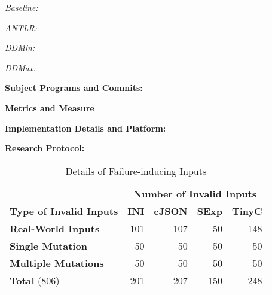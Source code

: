 \documentclass[sigconf,review,anonymous]{acmart}
\newcounter{todocounter}
\newcommand{\todo}[1]{\marginpar{$|$}\textcolor{red}{\stepcounter{todocounter}\footnote[\thetodocounter]{\textcolor{red}{\textbf{TODO }}\textit{#1}}}}
\renewcommand{\todo}[1]{}
\begin{document}
\todo{cite and create command shortcuts for the state-of-the-art}

\noindent \textit{Baseline:}

\noindent \textit{ANTLR:}

\noindent \textit{DDMin:}

\noindent \textit{DDMax:}




\noindent
\textbf{Subject Programs and Commits:}


\noindent
\textbf{Metrics and Measure}

\noindent
\textbf{Implementation Details and Platform:}

\noindent
\textbf{Research Protocol:} 



\begin{table}[!tbp]\centering
\caption{Details of Failure-inducing Inputs}
\begin{tabular}{|l | r | r | r | r |}
\hline
&  \multicolumn{4}{c|}{\textbf{Number of Invalid Inputs}}  \\
\textbf{Type of Invalid Inputs} & \textbf{INI} & \textbf{cJSON} & \textbf{SExp} & \textbf{TinyC} \\
\hline
\textbf{Real-World Inputs} & 101 & 107 & 50 & 148 \\
\textbf{Single Mutation} & 50 & 50 & 50 & 50 \\
\textbf{Multiple Mutations} & 50 & 50 & 50 & 50 \\
\hline
\textbf{Total } (806) & 201 & 207 & 150 & 248 \\
\hline
\end{tabular}
\label{tab:input-details}
\end{table}
\end{document}
